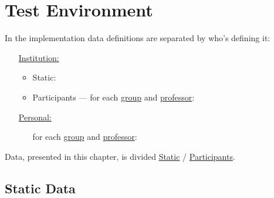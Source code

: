 \documentclass[../header]{subfiles}
\begin{document}
\providecommand{\rootdir}{..}


\section{Test Environment}

In the implementation data definitions are separated by who's defining it:
\begin{itemize}[leftmargin=2.1cm]
  \item[\underline{Institution:}]
    \begin{itemize}
      \item Static:
      \item Participants --- for each \underline{group} and \underline{professor}:\\
    \end{itemize}
  \item[\underline{Personal:}]
    \begin{itemize}
      \item[] for each \underline{group} and \underline{professor}:
    \end{itemize}
\end{itemize}

\noindent
Data, presented in this chapter, is divided \underline{Static} / \underline{Participants}.

\subsection{Static Data}
\end{document}
